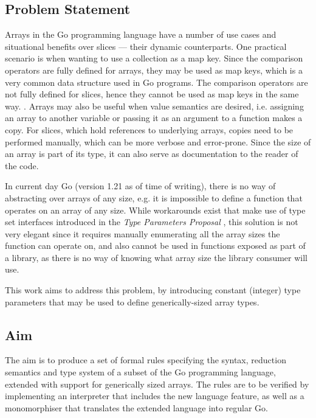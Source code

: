 

\subsection{Problem Statement}

Arrays in the Go programming language have a number of use cases and situational
benefits over slices --- their dynamic counterparts. One practical scenario is
when wanting to use a collection as a map key. Since the comparison operators
are fully defined for arrays, they may be used as map keys, which is a very
common data structure used in Go programs. The comparison operators are not
fully defined for slices, hence they cannot be used as map keys in the same way.
\autocite{spec}. Arrays may also be useful when value semantics are desired,
i.e. assigning an array to another variable or passing it as an argument to a
function makes a copy. For slices, which hold references to underlying arrays,
copies need to be performed manually, which can be more verbose and error-prone.
Since the size of an array is part of its type, it can also serve as
documentation to the reader of the code.

In current day Go (version 1.21 as of time of writing), there is no way of
abstracting over arrays of any size, e.g. it is impossible to define a function
that operates on an array of any size. While workarounds exist that make use of
type set interfaces introduced in the \emph{Type Parameters Proposal}
\autocite{genericsProposal}, this solution is not very elegant since it requires
manually enumerating all the array sizes the function can operate on, and also
cannot be used in functions exposed as part of a library, as there is no way of
knowing what array size the library consumer will use.

This work aims to address this problem, by introducing constant (integer) type
parameters that may be used to define generically-sized array types.

\subsection{Aim}

The aim is to produce a set of formal rules specifying the syntax, reduction
semantics and type system of a subset of the Go programming language, extended
with support for generically sized arrays. The rules are to be verified by
implementing an interpreter that includes the new language feature, as well
as a monomorphiser that translates the extended language into regular Go.

